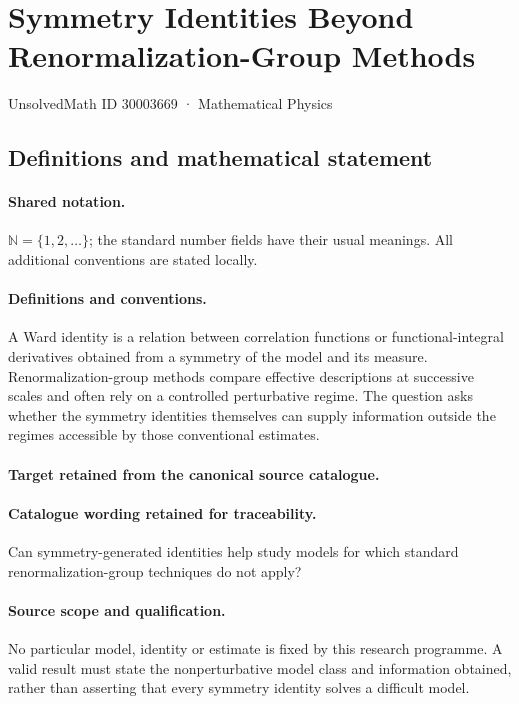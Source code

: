 \documentclass[11pt]{article}
\begin{document}
\setcounter{section}{30003668}
\section{Symmetry Identities Beyond Renormalization-Group Methods}\label{30003669}
{\small UnsolvedMath ID 30003669 · Mathematical Physics}
\subsection{Definitions and mathematical statement}

\paragraph{Shared notation.}$\mathbb N=\{1,2,\ldots\}$; the standard number fields have their usual meanings. All additional conventions are stated locally.


\paragraph{Definitions and conventions.}
A Ward identity is a relation between correlation functions or functional-integral derivatives obtained from a symmetry of the model and its measure. Renormalization-group methods compare effective descriptions at successive scales and often rely on a controlled perturbative regime. The question asks whether the symmetry identities themselves can supply information outside the regimes accessible by those conventional estimates.

\paragraph{Target retained from the canonical source catalogue.}
\paragraph{Catalogue wording retained for traceability.}
Can symmetry-generated identities help study models for which standard renormalization-group techniques do not apply?

\paragraph{Source scope and qualification.}
No particular model, identity or estimate is fixed by this research programme. A valid result must state the nonperturbative model class and information obtained, rather than asserting that every symmetry identity solves a difficult model.
\end{document}
